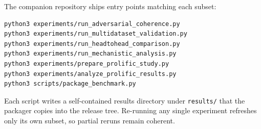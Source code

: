 The companion repository ships entry points matching each subset:

\begin{verbatim}
python3 experiments/run_adversarial_coherence.py
python3 experiments/run_multidataset_validation.py
python3 experiments/run_headtohead_comparison.py
python3 experiments/run_mechanistic_analysis.py
python3 experiments/prepare_prolific_study.py
python3 experiments/analyze_prolific_results.py
python3 scripts/package_benchmark.py
\end{verbatim}

Each script writes a self-contained results directory under
\texttt{results/} that the packager copies into the release tree. Re-running
any single experiment refreshes only its own subset, so partial reruns
remain coherent.
